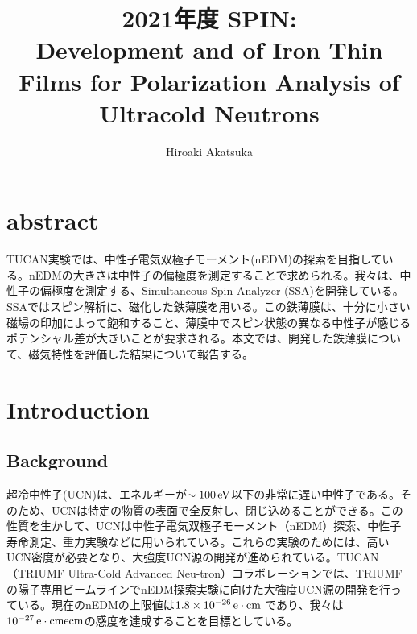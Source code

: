 \documentclass[onecolumn]{preport}
\title{2021年度 SPIN:\\
Development and  of Iron Thin Films for Polarization Analysis of Ultracold Neutrons}
\author{Hiroaki Akatsuka }
\begin{document}
\pagestyle{empty}
\maketitle
\thispagestyle{empty}
\sloppy

\section{abstract}
TUCAN実験では、中性子電気双極子モーメント(nEDM)の探索を目指している。nEDMの大きさは中性子の偏極度を測定することで求められる。我々は、中性子の偏極度を測定する、Simultaneous Spin Analyzer (SSA)を開発している\cite{SSA}。SSAではスピン解析に、磁化した鉄薄膜を用いる。この鉄薄膜は、十分に小さい磁場の印加によって飽和すること、薄膜中でスピン状態の異なる中性子が感じるポテンシャル差が大きいことが要求される。本文では、開発した鉄薄膜について、磁気特性を評価した結果について報告する。


\section{Introduction}

\subsection{Background}
超冷中性子(UCN)は、エネルギーが$\sim 100 \,\rm eV$以下の非常に遅い中性子である。そのため、UCNは特定の物質の表面で全反射し、閉じ込めることができる。この性質を生かして、UCNは中性子電気双極子モーメント（nEDM）探索、中性子寿命測定、重力実験などに用いられている。これらの実験のためには、高いUCN密度が必要となり、大強度UCN源の開発が進められている。TUCAN（TRIUMF Ultra-Cold Advanced Neu-tron）コラボレーションでは、TRIUMFの陽子専用ビームラインでnEDM探索実験に向けた大強度UCN源の開発を行っている。現在のnEDMの上限値は$1.8\times10^{-26}\,\rm e\cdot cm $ \cite{PSI}であり、我々は$10^{-27}\,\rm e\cdot cm ecm$の感度を達成することを目標としている。

\begin{comment}
\begin{figure}[tbh]
 \centering
 \texttt{[image: history.pdf]}
 \caption{Historical development of the experimental upper limit on the nEDM. The method and the location of the experiment are indicated in the legend. The theoretical predictions according to SM and BSM theories are shown on the right.}
\end{figure}

\begin{figure}[tbh]
 \centering
 \texttt{[image: nEDM.pdf]}
 \caption{スピン偏極解析の原理}
\end{figure}

\end{comment}
\end{document}
